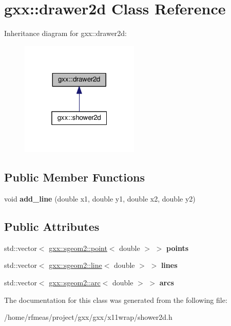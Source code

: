 \hypertarget{classgxx_1_1drawer2d}{}\section{gxx\+:\+:drawer2d Class Reference}
\label{classgxx_1_1drawer2d}


Inheritance diagram for gxx\+:\+:drawer2d\+:
\nopagebreak
\begin{figure}[H]
\begin{center}
\leavevmode
\includegraphics[width=160pt]{classgxx_1_1drawer2d__inherit__graph}
\end{center}
\end{figure}
\subsection*{Public Member Functions}
\begin{DoxyCompactItemize}
\item 
void {\bfseries add\+\_\+line} (double x1, double y1, double x2, double y2)\hypertarget{classgxx_1_1drawer2d_adcba98404f8d35e9e7a244c9e91756dc}{}\label{classgxx_1_1drawer2d_adcba98404f8d35e9e7a244c9e91756dc}

\end{DoxyCompactItemize}
\subsection*{Public Attributes}
\begin{DoxyCompactItemize}
\item 
std\+::vector$<$ \hyperlink{structgxx_1_1sgeom2_1_1point}{gxx\+::sgeom2\+::point}$<$ double $>$ $>$ {\bfseries points}\hypertarget{classgxx_1_1drawer2d_a2dd77a513bf244a5d81da391805f6471}{}\label{classgxx_1_1drawer2d_a2dd77a513bf244a5d81da391805f6471}

\item 
std\+::vector$<$ \hyperlink{structgxx_1_1sgeom2_1_1line}{gxx\+::sgeom2\+::line}$<$ double $>$ $>$ {\bfseries lines}\hypertarget{classgxx_1_1drawer2d_ac1b71acc53a28824b059515974566793}{}\label{classgxx_1_1drawer2d_ac1b71acc53a28824b059515974566793}

\item 
std\+::vector$<$ \hyperlink{structgxx_1_1sgeom2_1_1arc}{gxx\+::sgeom2\+::arc}$<$ double $>$ $>$ {\bfseries arcs}\hypertarget{classgxx_1_1drawer2d_aabda642d3a3b4c52db41a728b7171e41}{}\label{classgxx_1_1drawer2d_aabda642d3a3b4c52db41a728b7171e41}

\end{DoxyCompactItemize}


The documentation for this class was generated from the following file\+:\begin{DoxyCompactItemize}
\item 
/home/rfmeas/project/gxx/gxx/x11wrap/shower2d.\+h\end{DoxyCompactItemize}
